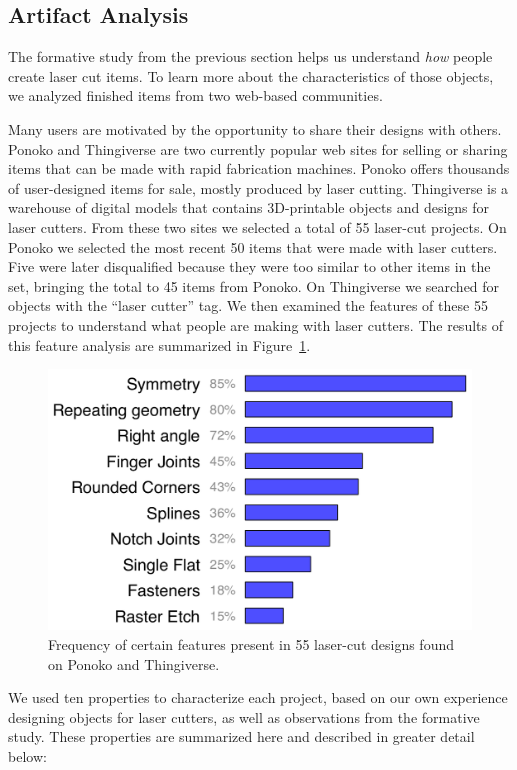 \documentclass{article}
\begin{document}
\subsection{Artifact Analysis}

The formative study from the previous section helps us understand
\textit{how} people create laser cut items. To learn more about the
characteristics of those objects, we analyzed finished items from two
web-based communities.

Many users are motivated by the opportunity to share their designs
with others. Ponoko and Thingiverse are two currently popular web
sites for selling or sharing items that can be made with rapid
fabrication machines. Ponoko offers thousands of user-designed items
for sale, mostly produced by laser cutting. Thingiverse is a warehouse
of digital models that contains 3D-printable objects and designs for
laser cutters. From these two sites we selected a total of 55
laser-cut projects. On Ponoko we selected the most recent 50 items
that were made with laser cutters. Five were later disqualified
because they were too similar to other items in the set, bringing the
total to 45 items from Ponoko. On Thingiverse we searched for objects
with the ``laser cutter'' tag. We then examined the features of these
55 projects to understand what people are making with laser
cutters. The results of this feature analysis are summarized in
Figure~\ref{fig:ponoko}.

\begin{figure}[h]
  \centering
  \includegraphics[width=0.9\linewidth]{img/ponoko-graph.pdf}
  \caption{Frequency of certain features present in 55 laser-cut
    designs found on Ponoko and Thingiverse.}
  \label{fig:ponoko}
\end{figure}

We used ten properties to characterize each project, based on our own
experience designing objects for laser cutters, as well as
observations from the formative study. These properties are summarized
here and described in greater detail below:
\end{document}

